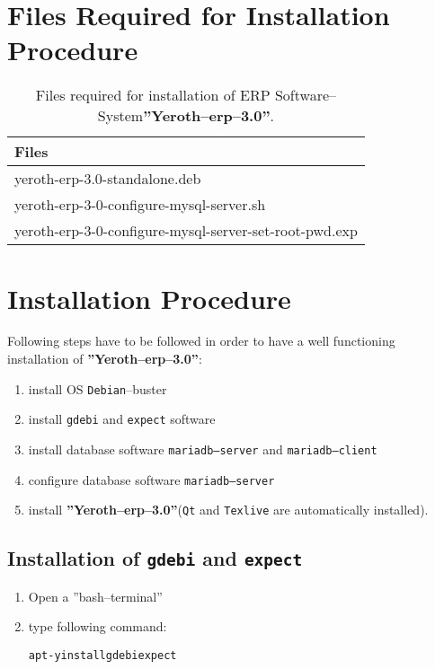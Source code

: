 \documentclass[a4paper, 10pt]{article}
\newcommand{\yerotherptroiszero}{\textbf{''Yeroth--erp--3.0''}\xspace}
\newcommand{\texlive}{\texttt{Texlive}\xspace}
\newcommand{\gdebi}{\texttt{gdebi}\xspace}
\newcommand{\expect}{\texttt{expect}\xspace}
\newcommand{\debian}{\texttt{Debian}\xspace}
\newcommand{\qt}{\texttt{Qt}\xspace}
\newcommand{\mariadbserver}{\texttt{mariadb--server}\xspace}
\newcommand{\mariadbclient}{\texttt{mariadb--client}\xspace}
\newcommand{\erp}{ERP Software--System\xspace}
\newcommand{\rootcommand}[1]{\textcolor{purplish}{#1\xspace}}
\begin{document}
\section{Files Required for Installation Procedure}

\begin{table}[!htbp]
\centering
\begin{tabular}{|l|} \hline
\textbf{Files}		\\ \hline
yeroth-erp-3.0-standalone.deb							\\ \hline
yeroth-erp-3-0-configure-mysql-server.sh				\\ \hline	
yeroth-erp-3-0-configure-mysql-server-set-root-pwd.exp	\\ \hline	
\end{tabular}
\caption{Files required for installation of
	 \erp \yerotherptroiszero.}
\label{tab:prerequisite-software}
\end{table}

\section{Installation Procedure}

Following steps have to be followed in order to have
a well functioning installation of \yerotherptroiszero:

\begin{enumerate} [1)]
	\item install OS \debian--buster
	\item install \gdebi and \expect software
	\item install database software \mariadbserver and \mariadbclient
	\item configure database software \mariadbserver
	\item install \yerotherptroiszero (\qt and \texlive are automatically installed).
\end{enumerate}

\subsection{Installation of \gdebi and \expect}

\begin{enumerate}[1)]
	\item Open a ''bash--terminal''
	\item type following command:
		\begin{alltt}
			\rootcommand{apt -y install gdebi expect}
		\end{alltt}
\end{enumerate} 
\end{document}
